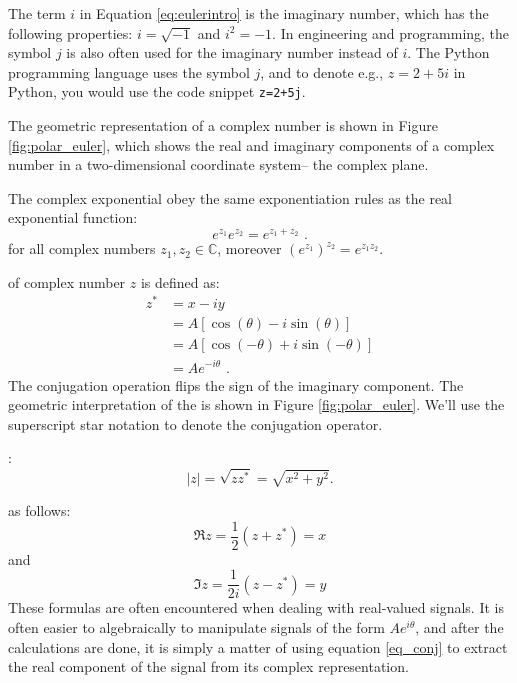 The term $i$ in Equation \ref{eq:eulerintro} is the imaginary number, which has the following properties: $i=\sqrt{-1}$ and $i^2 = -1$. In engineering and programming, the symbol $j$ is also often used for the imaginary number instead of $i$. The Python programming language uses the symbol $j$, and to denote e.g., $z=2+5i$ in Python, you would use the code snippet \verb|z=2+5j|.   %

The geometric representation of a complex number is shown in
Figure \ref{fig:polar_euler}, which shows the real and imaginary
components of a complex number in a two-dimensional coordinate system-- the complex plane.

The complex exponential obey the same exponentiation rules as the real exponential function:
\begin{equation}
  \boxed{
  e^{z_{1}}e^{z_{2}} = e^{z_{1}+z_{2}}
  }\,\,.
  \label{eq:complexexponentiation}
\end{equation}
for all complex numbers $z_{1},z_{2}\in\mathbb{C}$, moreover $(e^{z_{1}})^{z_{2}}=e^{z_{1}z_{2}}$.

 of complex number $z$ is defined as:
\begin{align}
  z^* & = x - iy                         \\
      & =A[\cos(\theta)-i\sin(\theta)]   \\
      & =A[\cos(-\theta)+i\sin(-\theta)] \\
      & =A e^{-i\theta}\,\,.
\end{align}
The conjugation operation flips the sign of the imaginary
component. The geometric interpretation of the  is
shown in Figure \ref{fig:polar_euler}.  We'll use the superscript star notation to denote the conjugation operator.

:
\begin{equation}
\boxed{
|z| = \sqrt{z z^*} = \sqrt{x^2 + y^2}.
}
\end{equation}

 as follows:
\begin{equation}
\boxed{
  \Re{z}  = \frac{1}{2}(z+z^*)=x
  \label{eq_conj}
  }
\end{equation}
and 
  \begin{equation}
\boxed{
  \Im{z}  = \frac{1}{2i}(z-z^*)=y
  \label{eq_conj2}
  }
\end{equation}
These formulas are often encountered when dealing with real-valued signals. It is often easier to algebraically to manipulate signals of the form $Ae^{i\theta}$, and after the calculations are done, it is simply a matter of using equation \ref{eq_conj} to extract the real component of the signal from its complex representation. 

